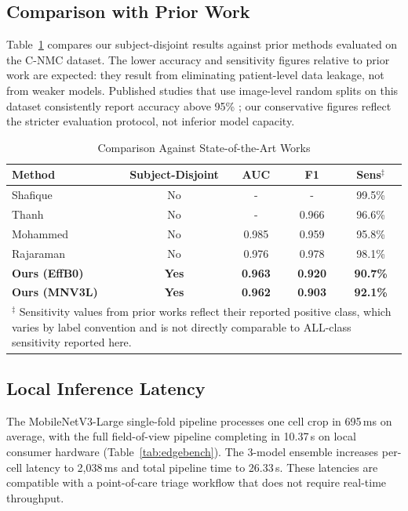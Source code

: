 \documentclass[journal,twoside,web]{ieeecolor}
\begin{document}
\subsection{Comparison with Prior Work}
Table~\ref{tab:sota} compares our subject-disjoint results against prior methods evaluated on the C-NMC dataset. The lower accuracy and sensitivity figures relative to prior work are expected: they result from eliminating patient-level data leakage, not from weaker models. Published studies that use image-level random splits on this dataset consistently report accuracy above 95\% \cite{b7, b10}; our conservative figures reflect the stricter evaluation protocol, not inferior model capacity.

\begin{table}[!t]
\caption{Comparison Against State-of-the-Art Works}
\label{tab:sota}
\centering
\begin{tabular}{@{}lcccc@{}}
\toprule
\textbf{Method} & \textbf{Subject-Disjoint} & \textbf{AUC} & \textbf{F1} & \textbf{Sens}$^{\ddag}$ \\ \midrule
Shafique \cite{b3} & No & - & - & 99.5\% \\
Thanh \cite{b4} & No & - & 0.966 & 96.6\% \\
Mohammed \cite{b7} & No & 0.985 & 0.959 & 95.8\% \\
Rajaraman \cite{b10}& No & 0.976 & 0.978 & 98.1\% \\
\textbf{Ours (EffB0)} & \textbf{Yes} & \textbf{0.963} & \textbf{0.920} & \textbf{90.7\%} \\
\textbf{Ours (MNV3L)} & \textbf{Yes} & \textbf{0.962} & \textbf{0.903} & \textbf{92.1\%} \\
\bottomrule
\multicolumn{5}{p{0.95\columnwidth}}{\small $^{\ddag}$ Sensitivity values from prior works reflect their reported positive class, which varies by label convention and is not directly comparable to ALL-class sensitivity reported here.}
\end{tabular}
\end{table}

\subsection{Local Inference Latency}
The MobileNetV3-Large single-fold pipeline processes one cell crop in 695\,ms on average, with the full field-of-view pipeline completing in 10.37\,s on local consumer hardware (Table~\ref{tab:edgebench}). The 3-model ensemble increases per-cell latency to 2,038\,ms and total pipeline time to 26.33\,s. These latencies are compatible with a point-of-care triage workflow that does not require real-time throughput.
\end{document}
